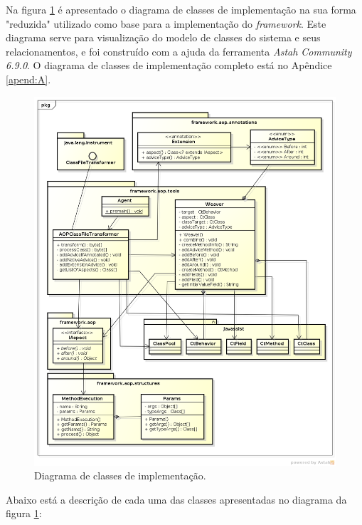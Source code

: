 \documentclass[tc,oneside]{iiufrgs}
\begin{document}
Na figura \ref{fig:diagramaClassesAOP} é apresentado o diagrama de classes de implementação na sua forma "reduzida" utilizado como base para a implementação do \textit{framework}. Este diagrama serve para visualização do modelo de classes do sistema e seus relacionamentos, e foi construído com a ajuda da ferramenta \textit{Astah Community 6.9.0}. O diagrama de classes de implementação completo está no Apêndice \ref{apend:A}.

\begin{figure}[ht]
	\centering
	\includegraphics[scale=0.4]{diagramas/Framework_AOP.png}
	\caption{Diagrama de classes de implementação.}
	\label{fig:diagramaClassesAOP}
\end{figure}

Abaixo está a descrição de cada uma das classes apresentadas no diagrama da figura \ref{fig:diagramaClassesAOP}:
\end{document}
